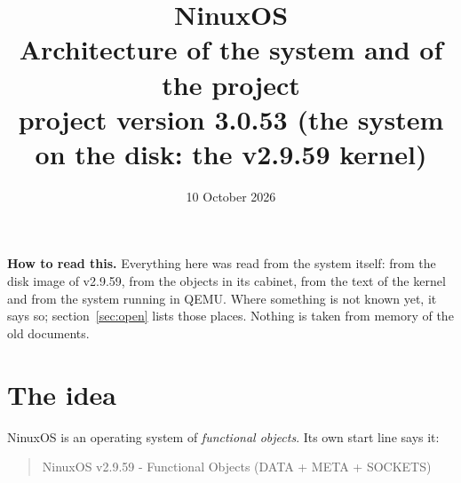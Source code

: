 \documentclass[11pt,a4paper]{article}
\title{NinuxOS\\[4pt]\large Architecture of the system and of the project\\[2pt]
\normalsize project version 3.0.53 \quad (the system on the disk: the v2.9.59 kernel)}
\author{}
\date{10 October 2026}
\begin{document}
\maketitle

\noindent\textbf{How to read this.} Everything here was read from the system itself: from the disk
image of v2.9.59, from the objects in its cabinet, from the text of the kernel and from the system
running in QEMU. Where something is not known yet, it says so; section~\ref{sec:open} lists those
places. Nothing is taken from memory of the old documents.

\tableofcontents
\newpage

\section{The idea}

NinuxOS is an operating system of \emph{functional objects}. Its own start line says it:
\begin{quote}\ttfamily NinuxOS v2.9.59 - Functional Objects (DATA + META + SOCKETS)\end{quote}
\end{document}
